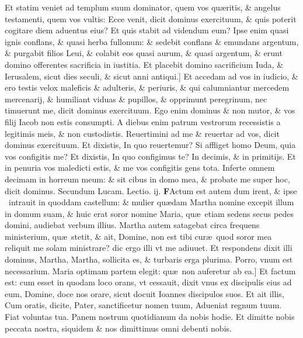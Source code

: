 \documentclass[a5paper,10pt]{book}
\def\rightmarginnote{%
	\lrmarginnote{\hskip\columnwidth \hskip -1em}}
\def\ae{æ}
\begin{document}
\begin{multicols*}{2}
Et statim veniet ad templum suum dominator, quem vos qu\ae ritis, \& angelus testamenti, quem vos vultis: Ecce venit, dicit dominus exercituum, \& quis poterit cogitare diem aduentus eius?
Et quis stabit ad videndum eum? Ipse enim quasi ignis conflans, \& quasi herba fullonum: \& sedebit conflans \& emundans argentum, \& purgabit filios Leui, \& colabit eos quasi aurum, \& quasi argentum, \& erunt domino offerentes sacrificia in iustitia.
Et placebit domino sacrificium Iuda, \& Ierusalem, sicut dies seculi, \& sicut anni antiqui.]
Et accedam ad vos in iudicio, \& ero testis velox maleficis \& adulteris, \& periuris, \& qui calumniantur mercedem mercenarij, \& humiliant viduas \& pupillos, \& opprimunt peregrinum, nec timuerunt me, dicit dominus exercituum.
Ego enim dominus \& non mutor, \& vos filij Iacob non estis consumpti.
A diebus enim patrum vestrorum recessistis a legitimis meis, \& non custodistis. Reuertimini ad me \& reuertar ad vos, dicit dominus exercituum.
Et dixistis, In quo reuertemur? Si affliget homo Deum, quia vos configitis me? Et dixistis, In quo configimus te? In decimis, \& in primitijs.
Et in penuria vos maledicti estis, \& me vos configitis gens tota.
Inferte omnem decimam in horreum meum: \& sit cibus in domo mea, \& probate me super hoc, dicit dominus.
\newline \color{red} Secundum Lucam. \hfill Lectio. ij. \color{black}
\vspace{-.25em}
\lettrine[lines=2]{\bfseries \color{red} F}{}Actum\rightmarginnote{c. 10.\\e} est autem dum irent, \& ipse \textdagger \ intrauit in quoddam
castellum: \& mulier qu\ae dam Martha nomine excepit illum in domum suam, \& huic erat soror nomine Maria, qu\ae \ etiam sedens secus pedes domini, audiebat verbum illius.
Martha autem satagebat circa frequens ministerium, qu\ae \ stetit, \& ait, Domine, non est tibi cur\ae \ quod soror mea reliquit me solam ministrare? dic ergo illi vt me adiuuet.
Et respondens dixit illi dominus, Martha, Martha, sollicita es, \& turbaris erga plurima.
Porro, vnum est necessarium. Maria optimam partem elegit: qu\ae \ non auferetur ab ea.]
\newline \indent Et\rightmarginnote{c. 11.\\a} factum est: cum esset in quodam loco orans, vt cessauit, dixit vnus ex discipulis eius ad eum, Domine, doce nos orare, sicut docuit Ioannes discipulos suos.
Et ait illis, Cum oratis, dicite, Pater, sanctificetur nomen tuum, Adueniat regnum tuum. Fiat voluntas tua.
Panem nostrum quotidianum da nobis hodie. Et dimitte nobis peccata nostra, siquidem \& nos dimittimus omni debenti nobis.

\end{multicols*}
\end{document}
